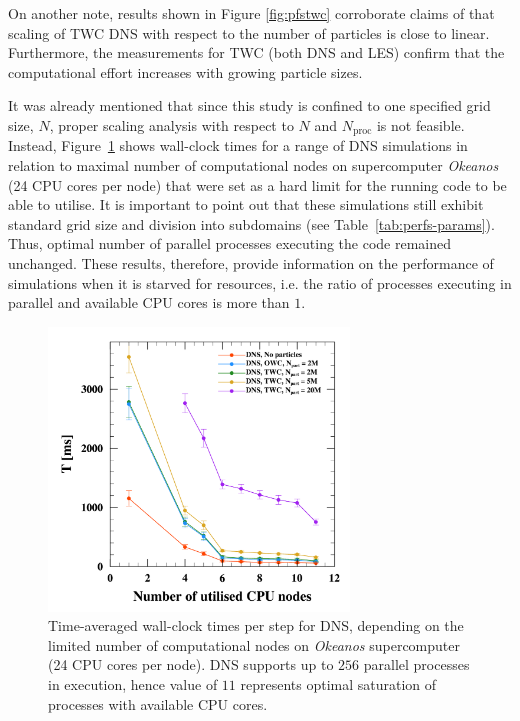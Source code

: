\documentclass{pracamgren}
\begin{document}
On another note, results shown in Figure \ref{fig:pfstwc} corroborate claims of \textcite{Rosa2022} that scaling of TWC DNS with respect to the number of particles is close to linear.
Furthermore, the measurements for TWC (both DNS and LES) confirm that the computational effort increases with growing particle sizes.

\medskip

It was already mentioned that since this study is confined to one specified grid size, $N$, proper scaling analysis with respect to $N$ and $N_\text{proc}$ is not feasible.
Instead, Figure~\ref{fig:pfspfn} shows wall-clock times for a range of DNS simulations in relation to maximal number of computational nodes on supercomputer \emph{Okeanos} (24 CPU cores per node) that were set as a hard limit for the running code to be able to utilise.
It is important to point out that these simulations still exhibit standard grid size and division into subdomains (see Table~\ref{tab:perfs-params}).
Thus, optimal number of parallel processes executing the code remained unchanged.
These results, therefore, provide information on the performance of simulations when it is starved for resources, i.e. the ratio of processes executing in parallel and available CPU cores is more than $1$.

\begin{figure}[ht]
\centering
\includegraphics[width=8cm]{figures/3-04_pfspfn.pdf}
\caption{
Time-averaged wall-clock times per step for DNS, depending on the limited number of computational nodes on \emph{Okeanos} supercomputer (24 CPU cores per node).
DNS supports up to $256$ parallel processes in execution, hence value of $11$ represents optimal saturation of processes with available CPU cores.
}
\label{fig:pfspfn}
\end{figure}
\end{document}
